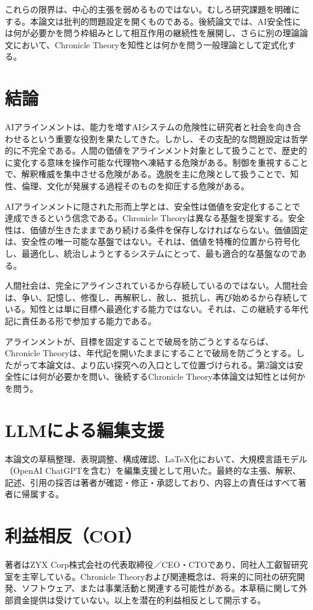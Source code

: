 \documentclass[11pt,a4paper]{ltjsarticle}
\begin{document}
これらの限界は、中心的主張を弱めるものではない。むしろ研究課題を明確にする。本論文は批判的問題設定を開くものである。後続論文では、AI安全性には何が必要かを問う枠組みとして相互作用の継続性を展開し、さらに別の理論論文において、Chronicle Theoryを知性とは何かを問う一般理論として定式化する。

\section{結論}

AIアラインメントは、能力を増すAIシステムの危険性に研究者と社会を向き合わせるという重要な役割を果たしてきた。しかし、その支配的な問題設定は哲学的に不完全である。人間の価値をアラインメント対象として扱うことで、歴史的に変化する意味を操作可能な代理物へ凍結する危険がある。制御を重視することで、解釈権威を集中させる危険がある。逸脱を主に危険として扱うことで、知性、倫理、文化が発展する過程そのものを抑圧する危険がある。

AIアラインメントに隠された形而上学とは、安全性は価値を安定化することで達成できるという信念である。Chronicle Theoryは異なる基盤を提案する。安全性は、価値が生きたままであり続ける条件を保存しなければならない。価値固定は、安全性の唯一可能な基盤ではない。それは、価値を特権的位置から符号化し、最適化し、統治しようとするシステムにとって、最も適合的な基盤なのである。

人間社会は、完全にアラインされているから存続しているのではない。人間社会は、争い、記憶し、修復し、再解釈し、赦し、抵抗し、再び始めるから存続している。知性とは単に目標へ最適化する能力ではない。それは、この継続する年代記に責任ある形で参加する能力である。

アラインメントが、目標を固定することで破局を防ごうとするならば、Chronicle Theoryは、年代記を開いたままにすることで破局を防ごうとする。したがって本論文は、より広い探究への入口として位置づけられる。第2論文は安全性には何が必要かを問い、後続するChronicle Theory本体論文は知性とは何かを問う。

\section*{LLMによる編集支援}

本論文の草稿整理、表現調整、構成確認、LaTeX化において、大規模言語モデル（OpenAI ChatGPTを含む）を編集支援として用いた。最終的な主張、解釈、記述、引用の採否は著者が確認・修正・承認しており、内容上の責任はすべて著者に帰属する。

\section*{利益相反（COI）}

著者はZYX Corp株式会社の代表取締役／CEO・CTOであり、同社人工叡智研究室を主宰している。Chronicle Theoryおよび関連概念は、将来的に同社の研究開発、ソフトウェア、または事業活動と関連する可能性がある。本草稿に関して外部資金提供は受けていない。以上を潜在的利益相反として開示する。

\printbibliography
\end{document}
